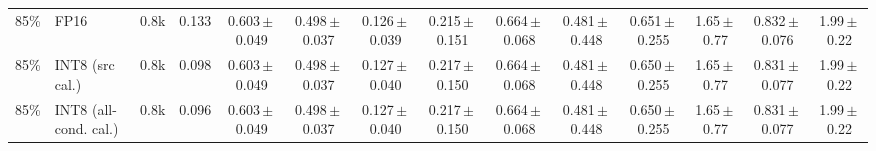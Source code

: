 \begin{tabular}{rl r r cccccccccc}
85\% & FP16 & 0.8k & 0.133 & 0.603\,$\pm$\,0.049 & 0.498\,$\pm$\,0.037 & 0.126\,$\pm$\,0.039 & 0.215\,$\pm$\,0.151 & 0.664\,$\pm$\,0.068 & 0.481\,$\pm$\,0.448 & 0.651\,$\pm$\,0.255 & 1.65\,$\pm$\,0.77 & 0.832\,$\pm$\,0.076 & 1.99\,$\pm$\,0.22 \\
85\% & INT8 (src cal.) & 0.8k & 0.098 & 0.603\,$\pm$\,0.049 & 0.498\,$\pm$\,0.037 & 0.127\,$\pm$\,0.040 & 0.217\,$\pm$\,0.150 & 0.664\,$\pm$\,0.068 & 0.481\,$\pm$\,0.448 & 0.650\,$\pm$\,0.255 & 1.65\,$\pm$\,0.77 & 0.831\,$\pm$\,0.077 & 1.99\,$\pm$\,0.22 \\
85\% & INT8 (all-cond. cal.) & 0.8k & 0.096 & 0.603\,$\pm$\,0.049 & 0.498\,$\pm$\,0.037 & 0.127\,$\pm$\,0.040 & 0.217\,$\pm$\,0.150 & 0.664\,$\pm$\,0.068 & 0.481\,$\pm$\,0.448 & 0.650\,$\pm$\,0.255 & 1.65\,$\pm$\,0.77 & 0.831\,$\pm$\,0.077 & 1.99\,$\pm$\,0.22 \\
\bottomrule
\end{tabular}